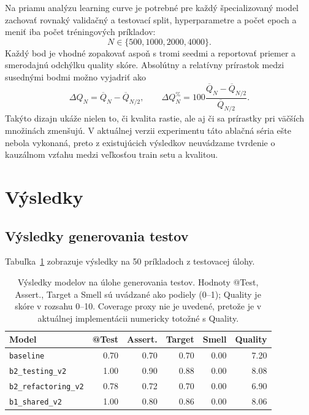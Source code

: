 \documentclass[11pt,a4paper]{article}
\newcommand{\modeltest}{\texttt{b2\_testing\_v2}}
\newcommand{\modelref}{\texttt{b2\_refactoring\_v2}}
\newcommand{\modelshared}{\texttt{b1\_shared\_v2}}
\begin{document}
Na priamu analýzu learning curve je potrebné pre každý špecializovaný model
zachovať rovnaký validačný a testovací split, hyperparametre a počet epoch a
meniť iba počet tréningových príkladov:
\begin{equation}
N \in \{500, 1000, 2000, 4000\}.
\end{equation}
Každý bod je vhodné zopakovať aspoň s tromi seedmi a reportovať priemer a
smerodajnú odchýlku quality skóre. Absolútny a relatívny prírastok medzi
susednými bodmi možno vyjadriť ako
\begin{equation}
\Delta Q_N = \overline{Q}_N-\overline{Q}_{N/2},
\qquad
\Delta Q_N^{\%}=100\frac{\overline{Q}_N-\overline{Q}_{N/2}}
{\overline{Q}_{N/2}}.
\end{equation}
Takýto dizajn ukáže nielen to, či kvalita rastie, ale aj či sa prírastky pri
väčších množinách zmenšujú. V aktuálnej verzii experimentu táto ablačná séria
ešte nebola vykonaná, preto z existujúcich výsledkov neuvádzame tvrdenie o
kauzálnom vzťahu medzi veľkosťou train setu a kvalitou.

\section{Výsledky}

\subsection{Výsledky generovania testov}

Tabuľka~\ref{tab:testing-results} zobrazuje výsledky na 50 príkladoch z testovacej úlohy.

\begin{table}[h]
\centering
\small
\begin{tabular}{lrrrrr}
\toprule
Model & @Test & Assert. & Target & Smell & Quality \\
\midrule
\texttt{baseline} & 0.70 & 0.70 & 0.70 & 0.00 & 7.20 \\
\modeltest & 1.00 & 0.90 & 0.88 & 0.00 & 8.08 \\
\modelref & 0.78 & 0.72 & 0.70 & 0.00 & 6.90 \\
\modelshared & 1.00 & 0.80 & 0.86 & 0.00 & 8.06 \\
\bottomrule
\end{tabular}
\caption{Výsledky modelov na úlohe generovania testov. Hodnoty @Test, Assert., Target a Smell sú uvádzané ako podiely (0--1); Quality je skóre v rozsahu 0--10. Coverage proxy nie je uvedené, pretože je v aktuálnej implementácii numericky totožné s Quality.}
\label{tab:testing-results}
\end{table}
\end{document}
